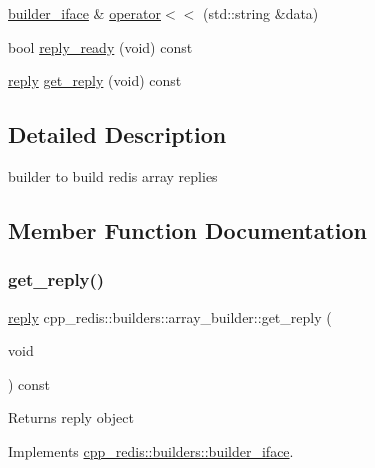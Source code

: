 \begin{DoxyCompactItemize}
\mbox{\hyperlink{classcpp__redis_1_1builders_1_1builder__iface}{builder\+\_\+iface}} \& \mbox{\hyperlink{classcpp__redis_1_1builders_1_1array__builder_a043357d0ef70406adef4df78c8d5307f}{operator$<$$<$}} (std\+::string \&data)
\item 
bool \mbox{\hyperlink{classcpp__redis_1_1builders_1_1array__builder_a524f2cb943dde1246dea1b7057e6351e}{reply\+\_\+ready}} (void) const
\item 
\mbox{\hyperlink{classcpp__redis_1_1reply}{reply}} \mbox{\hyperlink{classcpp__redis_1_1builders_1_1array__builder_ac5c805ad87b357a9578c5a0d479109b3}{get\+\_\+reply}} (void) const
\end{DoxyCompactItemize}


\subsection{Detailed Description}
builder to build redis array replies 

\subsection{Member Function Documentation}
\mbox{\label{classcpp__redis_1_1builders_1_1array__builder_ac5c805ad87b357a9578c5a0d479109b3}} 
\subsubsection{\texorpdfstring{get\+\_\+reply()}{get\_reply()}}
{\footnotesize\ttfamily \mbox{\hyperlink{classcpp__redis_1_1reply}{reply}} cpp\+\_\+redis\+::builders\+::array\+\_\+builder\+::get\+\_\+reply (\begin{DoxyParamCaption}\item[{void}]{ }\end{DoxyParamCaption}) const\hspace{0.3cm}{\ttfamily [virtual]}}

\begin{DoxyReturn}{Returns}
reply object 
\end{DoxyReturn}


Implements \mbox{\hyperlink{classcpp__redis_1_1builders_1_1builder__iface_afd2ff2c2371c2a486116543b638b9413}{cpp\+\_\+redis\+::builders\+::builder\+\_\+iface}}.

